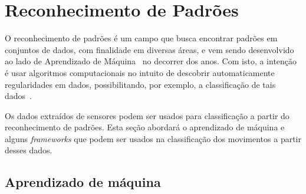 



\section{Reconhecimento de Padrões}\label{sec:patternrec}

O reconhecimento de padrões é um campo que busca encontrar padrões em conjuntos de dados, com finalidade em diversas áreas, e vem sendo desenvolvido ao lado de Aprendizado de Máquina~\cite{samuel:1959machine_learning} no decorrer dos anos. Com isto, a intenção é usar algoritmos computacionais no intuito de descobrir automaticamente regularidades em dados, possibilitando, por exemplo, a classificação de tais dados~\cite{bishop:2006}.

Os dados extraídos de sensores podem ser usados para classificação a partir do reconhecimento de padrões. Esta seção abordará o aprendizado de máquina e alguns \textit{frameworks} que podem ser usados na classificação dos movimentos a partir desses dados.

\subsection{Aprendizado de máquina}\label{sec:ml}

